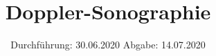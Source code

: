 

\subject{US3}
\title{Doppler-Sonographie}
\date{%
  Durchführung: 30.06.2020
  \hspace{3em}
  Abgabe: 14.07.2020
}



\maketitle
\thispagestyle{empty}
\tableofcontents
\newpage







\printbibliography{}


